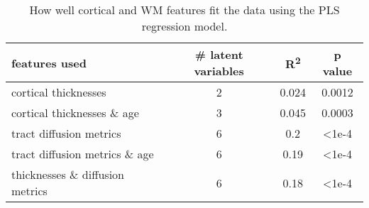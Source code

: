 \begin{table} 
    \begin{tabular}{ l | c c c }
        features used & # latent variables & R\textsuperscript{2} & p value \\
        \toprule
        cortical thicknesses & 2 & 0.024 & 0.0012 \\
        cortical thicknesses \& age & 3 & 0.045 & 0.0003 \\
        tract diffusion metrics & 6 & 0.2 & \textless 1e-4 \\
        tract diffusion metrics \& age & 6 & 0.19 & \textless 1e-4 \\
        thicknesses \& diffusion metrics & 6 & 0.18 & \textless 1e-4 \\
        \bottomrule
    \end{tabular} 
    \caption{\label{tab:PLSmodels} How well cortical and WM features fit the data using the PLS regression model.} 
\end{table}